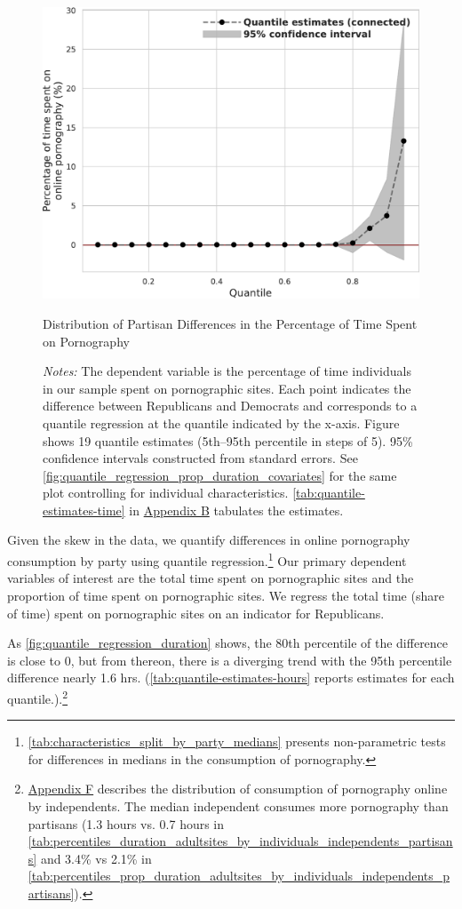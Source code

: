 \documentclass[12pt,twoside]{article}
\begin{document}
\begin{figure}[t]
	\centering
	\includegraphics[width=.7\linewidth]{figs/quantile_reg_proportion_duration_adult.pdf}
	\caption{Distribution of Partisan Differences in the Percentage of Time Spent on Pornography}
	\caption*{\footnotesize \emph{Notes:} 
		The dependent variable is the percentage of time individuals in our sample spent on pornographic sites.
		Each point indicates the difference between Republicans and Democrats and corresponds to a quantile regression at the quantile indicated by the x-axis.
  Figure shows 19 quantile estimates (5th--95th percentile in steps of 5).
		95\% confidence intervals constructed from standard errors.
		See \cref{fig:quantile_regression_prop_duration_covariates} for the same plot controlling for individual characteristics.
            \cref{tab:quantile-estimates-time} in \hyperref[sm:smB]{Appendix B} tabulates the estimates.
	}
	\label{fig:quantile_regression_prop_duration}
\end{figure}

Given the skew in the data, we quantify differences in online pornography consumption by party using quantile regression.\footnote{\cref{tab:characteristics_split_by_party_medians} presents non-parametric tests for differences in medians in the consumption of pornography.} Our primary dependent variables of interest are the total time spent on pornographic sites and the proportion of time spent on pornographic sites. We regress the total time (share of time) spent on pornographic sites on an indicator for Republicans. 

As \cref{fig:quantile_regression_duration} shows, the 80th percentile of the difference is close to 0, but from thereon, there is a diverging trend with the 95th percentile difference nearly 1.6 hrs. (\cref{tab:quantile-estimates-hours} reports estimates for each quantile.).\footnote{\hyperref[sm:smF]{Appendix F} describes the distribution of consumption of pornography online by independents. The median independent consumes more pornography than partisans (1.3 hours vs. 0.7 hours in \cref{tab:percentiles_duration_adultsites_by_individuals_independents_partisans} and 3.4\% vs 2.1\% in \cref{tab:percentiles_prop_duration_adultsites_by_individuals_independents_partisans}).}
\end{document}
